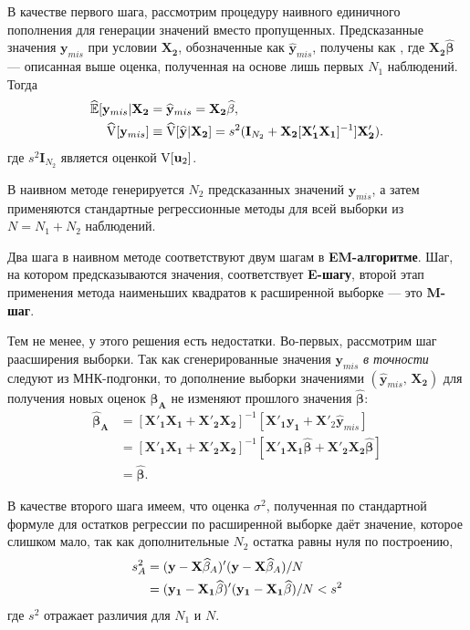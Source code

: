 В качестве первого шага, рассмотрим процедуру наивного единичного пополнения для генерации значений вместо пропущенных. Предсказанные значения $\mathbf{y}_{mis}$ при условии $\mathbf{X_2}$, обозначенные как $\widehat{\mathbf{y}}_{mis}$, получены как , где $\mathbf{X_2} \widehat{\mathbf{\beta}}$ --- описанная выше оценка, полученная на основе лишь первых $N_1$ наблюдений. Тогда
\begin{align}
\widehat{\mathbb{E}}[\mathbf{y}_{mis}|\mathbf{X_2}&=\widehat{\mathbf{y}}_{mis}=\mathbf{X_2} \widehat{\mathbf{\beta}}, \\
\widehat{\mathrm{V}}[\mathbf{y}_{mis}]&\equiv \widehat{\mathrm{V}}[\widehat{\mathbf{y}}|\mathbf{X_2}]=s^2(\mathbf{I}_{N_2}+\mathbf{X_2}[\mathbf{X'_1 X_1}]^{-1}]\mathbf{X'_2}). \notag
\end{align}
где $s^2\mathbf{I}_{N_2}$ является оценкой $\mathrm{V}[\mathbf{u}_2]$.

В наивном методе генерируется $N_2$ предсказанных значений $\mathbf{y}_{mis}$, а затем применяются стандартные регрессионные методы для всей выборки из $N=N_1+N_2$ наблюдений.

Два шага в наивном методе соответствуют двум шагам в {\bf EM-алгоритме}. Шаг, на котором предсказываются значения, соответствует {\bf E-шагу}, второй этап применения метода наименьших квадратов к расширенной выборке --- это {\bf M-шаг}.



Тем не менее, у этого решения есть недостатки. Во-первых, рассмотрим шаг раасширения выборки. Так как сгенерированные значения $\mathbf{y}_{mis}$ \emph{в точности} следуют из МНК-подгонки, то дополнение выборки значениями $(\widehat{\mathbf{y}}_{mis}, \, \mathbf{X_2})$ для получения новых оценок $\mathbf{\widehat{\beta}_A}$ не изменяют прошлого значения $\widehat{\mathbf{\beta}}$:
\begin{align*}
\mathbf{\widehat{\beta}_A}&= [\mathbf{X'_1 X_1}+\mathbf{X'_2 X_2}]^{-1}[\mathbf{X'_1 y_1}+\mathbf{X'}_2 \widehat{\mathbf{y}}_{mis}] \\
&=[\mathbf{X'_1 X_1}+\mathbf{X'_2 X_2}]^{-1}[\mathbf{X'_1 X_1}\widehat{\mathbf{\beta}}+\mathbf{X'_2 X_2}\widehat{\mathbf{\beta}}] \\
&= \widehat{\mathbf{\beta}}.
\end{align*}

В качестве второго шага имеем, что оценка $\sigma^2$, полученная по стандартной формуле для остатков регрессии по расширенной выборке даёт значение, которое слишком мало, так как дополнительные $N_2$ остатка равны нуля по построению,
\begin{align}
s^2_A &= (\mathbf{y-X}\widehat{\mathbf{\beta}}_A)'(\mathbf{y-X}\widehat{\mathbf{\beta}}_A)/N \\
&= (\mathbf{y_1-X_1}\widehat{\mathbf{\beta}})'(\mathbf{y_1-X_1}\widehat{\mathbf{\beta}})/N<s^2 \notag
\end{align}
где $s^2$ отражает различия для $N_1$ и $N$.

